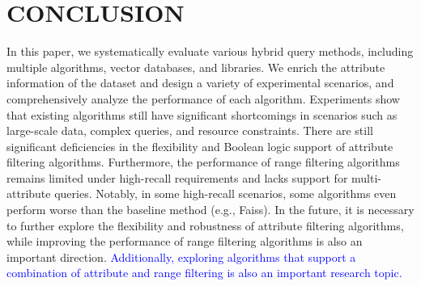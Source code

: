 \documentclass[sigconf, nonacm]{acmart}
\begin{document}
{	\section{CONCLUSION}
	In this paper, we systematically evaluate various hybrid query methods, including multiple algorithms, vector databases, and libraries. We enrich the attribute information of the dataset and design a variety of experimental scenarios, and comprehensively analyze the performance of each algorithm. Experiments show that existing algorithms still have significant shortcomings in scenarios such as large-scale data, complex queries, and resource constraints. There are still significant deficiencies in the flexibility and Boolean logic support of attribute filtering algorithms. Furthermore, the performance of range filtering algorithms remains limited under high-recall requirements and lacks support for multi-attribute queries. Notably, in some high-recall scenarios, some algorithms even perform worse than the baseline method (e.g., Faiss). In the future, it is necessary to further explore the flexibility and robustness of attribute filtering algorithms, while improving the performance of range filtering algorithms is also an important direction. \textcolor{blue}{Additionally, exploring algorithms that support a combination of attribute and range filtering is also an important research topic.}
}
\end{document}
